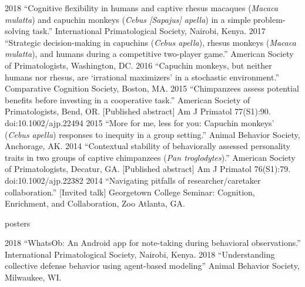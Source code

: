\documentclass[]{friggeri-cv}
\begin{document}
\begin{entrylist2}
  \entrytwo
    {2018}
    {``Cognitive flexibility in humans and captive rhesus macaques (\emph{Macaca mulatta}) and capuchin monkeys (\emph{Cebus [Sapajus] apella}) in a simple problem-solving task.'' International Primatological Society, Nairobi, Kenya.}
  \entrytwo
    {2017}
    {``Strategic decision-making in capuchins (\emph{Cebus apella}), rhesus monkeys (\emph{Macaca mulatta}), and humans during a competitive two-player game.'' American Society of Primatologists, Washington, DC.}
  \entrytwo
    {2016}
    {``Capuchin monkeys, but neither humans nor rhesus, are `irrational maximizers' in a stochastic environment.'' Comparative Cognition Society, Boston, MA.}
  \entrytwo
    {2015}
    {``Chimpanzees assess potential benefits before investing in a cooperative task.'' American Society of Primatologists, Bend, OR. [Published abstract] Am J Primatol 77(S1):90. doi:10.1002/ajp.22494}
  \entrytwo
    {2015}
    {``More for me, less for you: Capuchin monkeys' (\emph{Cebus apella}) responses to inequity in a group setting.'' Animal Behavior Society, Anchorage, AK.}
  \entrytwo
    {2014}
    {``Contextual stability of behaviorally assessed personality traits in two groups of captive chimpanzees (\emph{Pan troglodytes}).'' American Society of Primatologists, Decatur, GA. [Published abstract] Am J Primatol 76(S1):79. doi:10.1002/ajp.22382}
  \entrytwo
    {2014}
    {``Navigating pitfalls of researcher/caretaker collaboration.'' [Invited talk] Georgetown College Seminar: Cognition, Enrichment, and Collaboration, Zoo Atlanta, GA.}
\end{entrylist2}


{\subfont\large{} posters}

\begin{entrylist2}
  \entrytwo
    {2018}
    {``WhatsOb: An Android app for note-taking during behavioral observations.'' International Primatological Society, Nairobi, Kenya.}
  \entrytwo
    {2018}
    {``Understanding collective defense behavior using agent-based modeling'' Animal Behavior Society, Milwaukee, WI.}
\end{entrylist2}\\[-.2cm]


\newpage
\thispagestyle{fancy}
\end{document}
